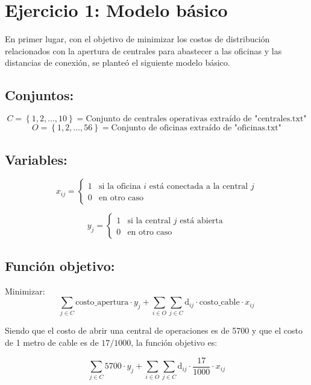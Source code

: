 \documentclass{article}
\begin{document}
\section*{Ejercicio 1: Modelo básico}

En primer lugar, con el objetivo de minimizar los costos de distribución relacionados con la apertura de centrales para abastecer a las oficinas y las distancias de conexión, se planteó el siguiente modelo básico.

\subsection*{Conjuntos:}
\[
C = \left\{ 1, 2, \ldots, 10 \right\} = \text{Conjunto de centrales operativas extraído de "centrales.txt"}
\]
\[
O = \left\{ 1, 2, \ldots, 56 \right\} = \text{Conjunto de oficinas extraído de "oficinas.txt"}
\]

\vspace{0.5cm}

\subsection*{Variables:}
\[
x_{ij} = 
\begin{cases} 
1 & \text{si la oficina } i \text{ está conectada a la central } j \\ 
0 & \text{en otro caso}
\end{cases}
\]

\vspace{0.5cm}

\[
y_j = 
\begin{cases} 
1 & \text{si la central } j \text{ está abierta} \\ 
0 & \text{en otro caso}
\end{cases}
\]

\subsection*{Función objetivo:}

Minimizar:
\[
\sum_{j \in C} \text{costo\_apertura} \cdot y_j + \sum_{i \in O} \sum_{j \in C} \text{d}_{ij} \cdot \text{costo\_cable} \cdot x_{ij}
\]

Siendo que el costo de abrir una central de operaciones es de 5700 y que el costo de 1 metro de cable es de \(17/1000\), la función objetivo es:

\[
\sum_{j \in C} 5700 \cdot y_j + \sum_{i \in O} \sum_{j \in C} \text{d}_{ij} \cdot \frac{17}{1000} \cdot x_{ij}
\]
\end{document}
